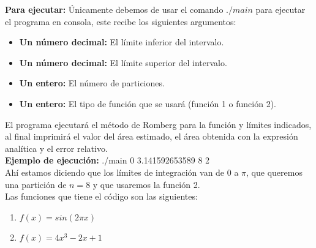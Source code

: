 \documentclass[12pt]{article}
\begin{document}
\textbf{Para ejecutar:} Únicamente debemos de usar el comando $./main$ para ejecutar el programa en consola, este recibe los siguientes argumentos:
\begin{itemize}
	\item \textbf{Un número decimal:} El límite inferior del intervalo.
	\item \textbf{Un número decimal:} El límite superior del intervalo.
	\item \textbf{Un entero:} El número de particiones.
	\item \textbf{Un entero:} El tipo de función que se usará (función 1 o función 2). 
\end{itemize}

El programa ejecutará el método de Romberg para la función y límites indicados, al final imprimirá el valor del área estimado, el área obtenida con la expresión analítica y el error relativo.\\

\textbf{Ejemplo de ejecución:} ./main 0 3.141592653589 8 2\\

Ahí estamos diciendo que los límites de integración van de 0 a $\pi$, que queremos una partición de $n = 8$ y que usaremos la función 2.\\
Las funciones que tiene el código son las siguientes:
\begin{enumerate}
	\item $f(x) = sin(2 \pi x)$
	\item $f(x) = 4x^3 - 2x + 1$
\end{enumerate}
\end{document}
